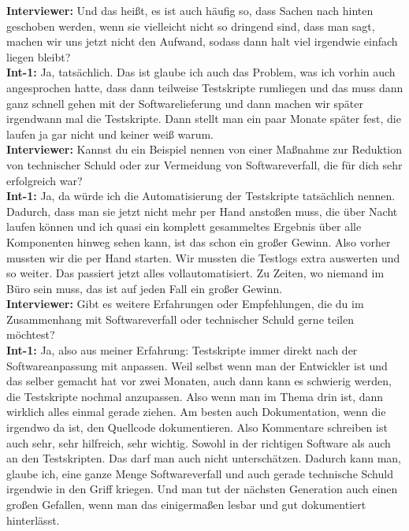 \textbf{Interviewer:} Und das heißt, es ist auch häufig so, dass Sachen nach hinten geschoben werden, wenn sie vielleicht nicht so dringend sind, dass man sagt, machen wir uns jetzt nicht den Aufwand, sodass dann halt viel irgendwie einfach liegen bleibt?\\
\textbf{Int-1:} Ja, tatsächlich. Das ist glaube ich auch das Problem, was ich vorhin auch angesprochen hatte, dass dann teilweise Testskripte rumliegen und das muss dann ganz schnell gehen mit der Softwarelieferung und dann machen wir später irgendwann mal die Testskripte. Dann stellt man ein paar Monate später fest, die laufen ja gar nicht und keiner weiß warum. \\
\textbf{Interviewer:} Kannst du ein Beispiel nennen von einer Maßnahme zur Reduktion von technischer Schuld oder zur Vermeidung von Softwareverfall, die für dich sehr erfolgreich war? \\
\textbf{Int-1:} Ja, da würde ich die Automatisierung der Testskripte tatsächlich nennen. Dadurch, dass man sie jetzt nicht mehr per Hand anstoßen muss, die über Nacht laufen können und ich quasi ein komplett gesammeltes Ergebnis über alle Komponenten hinweg sehen kann, ist das schon ein großer Gewinn. Also vorher mussten wir die per Hand starten. Wir mussten die Testlogs extra auswerten und so weiter. Das passiert jetzt alles vollautomatisiert. Zu Zeiten, wo niemand im Büro sein muss, das ist auf jeden Fall ein großer Gewinn. \\
\textbf{Interviewer:} Gibt es weitere Erfahrungen oder Empfehlungen, die du im Zusammenhang mit Softwareverfall oder technischer Schuld gerne teilen möchtest?\\
\textbf{Int-1:} Ja, also aus meiner Erfahrung: Testskripte immer direkt nach der Softwareanpassung mit anpassen. Weil selbst wenn man der Entwickler ist und das selber gemacht hat vor zwei Monaten, auch dann kann es schwierig werden, die Testskripte nochmal anzupassen. Also wenn man im Thema drin ist, dann wirklich alles einmal gerade ziehen. Am besten auch Dokumentation, wenn die irgendwo da ist, den Quellcode dokumentieren. Also Kommentare schreiben ist auch sehr, sehr hilfreich, sehr wichtig. Sowohl in der richtigen Software als auch an den Testskripten. Das darf man auch nicht unterschätzen. Dadurch kann man, glaube ich, eine ganze Menge Softwareverfall und auch gerade technische Schuld irgendwie in den Griff kriegen. Und man tut der nächsten Generation auch einen großen Gefallen, wenn man das einigermaßen lesbar und gut dokumentiert hinterlässt.\\

